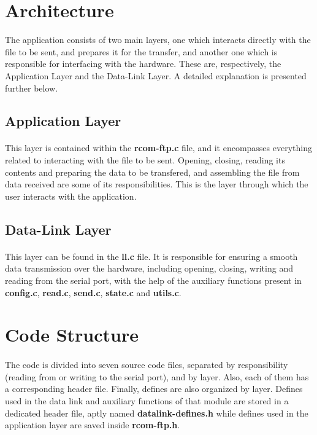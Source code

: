 \documentclass[11pt]{article}
\begin{document}
\section{Architecture}

The application consists of two main layers, one which interacts directly with the file to be sent, and prepares it for the transfer, and another one which is responsible for interfacing with the hardware. These are, respectively, the Application Layer and the Data-Link Layer. A detailed explanation is presented further below.

\subsection{Application Layer}

\paragraph{}This layer is contained within the \textbf{rcom-ftp.c} file, and it encompasses everything related to interacting with the file to be sent. Opening, closing, reading its contents and preparing the data to be transfered, and assembling the file from data received are some of its responsibilities. This is the layer through which the user interacts with the application.

\subsection{Data-Link Layer}

\paragraph{}This layer can be found in the \textbf{ll.c} file. It is responsible for ensuring a smooth data transmission over the hardware, including opening, closing, writing and reading from the serial port, with the help of the auxiliary functions present in \textbf{config.c}, \textbf{read.c}, \textbf{send.c}, \textbf{state.c} and \textbf{utils.c}.

\section{Code Structure}

\paragraph{}The code is divided into seven source code files, separated by responsibility (reading from or writing to the serial port), and by layer. Also, each of them has a corresponding header file. Finally, defines are also organized by layer. Defines used in the data link and auxiliary functions of that module are stored in a dedicated header file, aptly named \textbf{datalink-defines.h} while defines used in the application layer are saved inside \textbf{rcom-ftp.h}. 
\end{document}
